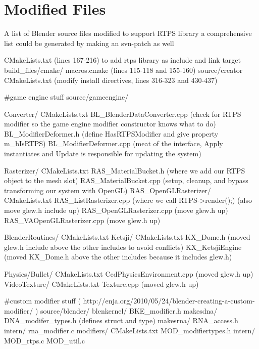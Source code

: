 

\section{Modified Files}
A list of Blender source files modified to support RTPS library
a comprehensive list could be generated by making an svn-patch as well


CMakeLists.txt (lines 167-216) to add rtps library as include and link target
build_files/cmake/
    macros.cmake (lines 115-118 and 155-160)
source/creator
    CMakeLists.txt (modify install directives, lines 316-323 and 430-437)

#game engine stuff
source/gameengine/

    Converter/
        CMakeLists.txt
        BL_BlenderDataConverter.cpp (check for RTPS modifier so the game engine modifier constructor knows what to do)
        BL_ModifierDeformer.h (define HasRTPSModifier and give property m_bIsRTPS)
        BL_ModifierDeformer.cpp (meat of the interface, Apply instantiates and Update is responsible for updating the system)       
 
    Rasterizer/
        CMakeLists.txt
        RAS_MaterialBucket.h (where we add our RTPS object to the mesh slot)
        RAS_MaterialBucket.cpp (setup, cleanup, and bypass transforming our system with OpenGL)
        RAS_OpenGLRasterizer/
            CMakeLists.txt
            RAS_ListRasterizer.cpp (where we call RTPS->render();) (also move glew.h include up)
            RAS_OpenGLRasterizer.cpp (move glew.h up)
            RAS_VAOpenGLRasterizer.cpp (move glew.h up)

    BlenderRoutines/
        CMakeLists.txt
    Ketsji/
        CMakeLists.txt
        KX_Dome.h (moved glew.h include above the other includes to avoid conflicts)
        KX_KetsjiEngine (moved KX_Dome.h above the other includes because it includes glew.h)

    Physics/Bullet/
        CMakeLists.txt
        CcdPhysicsEnvironment.cpp (moved glew.h up) 
    VideoTexture/
        CMakeLists.txt 
        Texture.cpp (moved glew.h up)

#custom modifier stuff ( http://enja.org/2010/05/24/blender-creating-a-custom-modifier/ )
source/blender/
    blenkernel/
        BKE_modifier.h
    makesdna/
        DNA_modifer_types.h (defines struct and type)
    makesrna/
        RNA_access.h 
        intern/
            rna_modifier.c
    modifiers/
        CMakeLists.txt
        MOD_modifiertypes.h
        intern/
            MOD_rtps.c
            MOD_util.c
    
